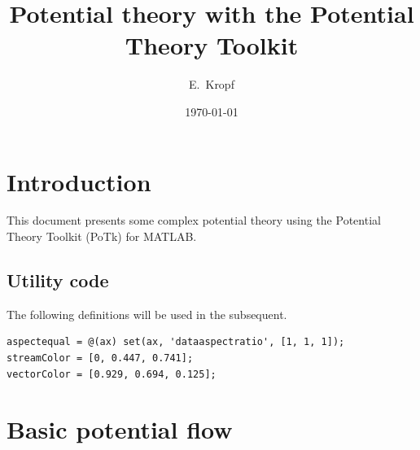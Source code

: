\documentclass[12pt,fleqn]{article}
\begin{document}
\title{Potential theory with the Potential Theory Toolkit}
\author{E.~Kropf}
\date{\today}
\maketitle

\section{Introduction}
This document presents some complex potential theory using the Potential Theory Toolkit (PoTk) for MATLAB.

\subsection{Utility code}
The following definitions will be used in the subsequent.
\begin{lstlisting}
aspectequal = @(ax) set(ax, 'dataaspectratio', [1, 1, 1]);
streamColor = [0, 0.447, 0.741];
vectorColor = [0.929, 0.694, 0.125];
\end{lstlisting}

\section{Basic potential flow}
\end{document}
